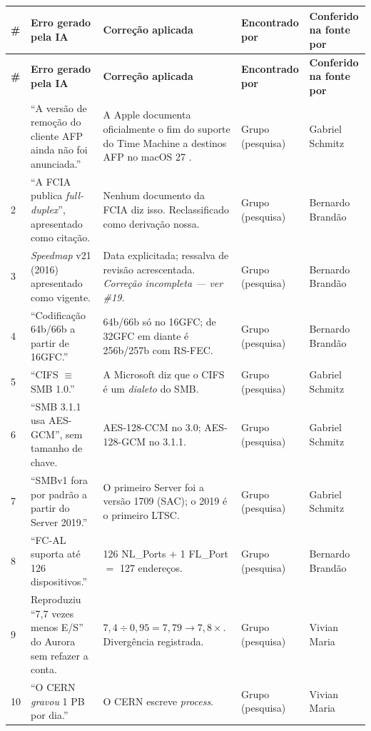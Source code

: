 \documentclass[11pt,a4paper]{article}
\begin{document}
{\scriptsize \setlength{\tabcolsep}{3pt}
\begin{longtable}{@{}p{0.35cm}p{4.6cm}p{5.5cm}p{2.0cm}p{2.0cm}@{}}
\toprule
\textbf{\#} & \textbf{Erro gerado pela IA} & \textbf{Correção aplicada} & \textbf{Encontrado por} &
\textbf{Conferido na fonte por} \\
\midrule
\endfirsthead
\toprule
\textbf{\#} & \textbf{Erro gerado pela IA} & \textbf{Correção aplicada} & \textbf{Encontrado por} &
\textbf{Conferido na fonte por} \\
\midrule
\endhead
\bottomrule
\endfoot
1 & ``A versão de remoção do cliente AFP ainda não foi anunciada.'' & A Apple documenta
oficialmente o fim do suporte do Time Machine a destinos AFP no macOS 27
\cite{appleafptm}. & Grupo (pesquisa) & Gabriel Schmitz \\
2 & ``A FCIA publica \textit{full-duplex}'', apresentado como citação. & Nenhum documento da FCIA
diz isso. Reclassificado como derivação nossa. & Grupo (pesquisa) & Bernardo Brandão \\
3 & \textit{Speedmap} v21 (2016) apresentado como vigente. & Data explicitada; ressalva de revisão
acrescentada. \emph{Correção incompleta --- ver \#19.} & Grupo (pesquisa) & Bernardo Brandão \\
4 & ``Codificação 64b/66b a partir de 16GFC.'' & 64b/66b só no 16GFC; de 32GFC em diante é
256b/257b com RS-FEC. & Grupo (pesquisa) & Bernardo Brandão \\
5 & ``CIFS $\equiv$ SMB 1.0.'' & A Microsoft diz que o CIFS é um \emph{dialeto} do SMB. & Grupo (pesquisa) &
Gabriel Schmitz \\
6 & ``SMB 3.1.1 usa AES-GCM'', sem tamanho de chave. & AES-128-CCM no 3.0; AES-128-GCM no 3.1.1. &
Grupo (pesquisa) & Gabriel Schmitz \\
7 & ``SMBv1 fora por padrão a partir do Server 2019.'' & O primeiro Server foi a versão 1709 (SAC);
o 2019 é o primeiro LTSC. & Grupo (pesquisa) & Gabriel Schmitz \\
8 & ``FC-AL suporta até 126 dispositivos.'' & 126 NL\_Ports $+$ 1 FL\_Port $=$ 127 endereços. &
Grupo (pesquisa) & Bernardo Brandão \\
9 & Reproduziu ``7,7 vezes menos E/S'' do Aurora sem refazer a conta. & $7{,}4 \div 0{,}95 = 7{,}79
\rightarrow 7{,}8\times$. Divergência registrada. & Grupo (pesquisa) & Vivian Maria \\
10 & ``O CERN \emph{gravou} 1 PB por dia.'' & O CERN escreve \emph{process}. & Grupo (pesquisa) &
Vivian Maria \\

\end{longtable}}
\end{document}
